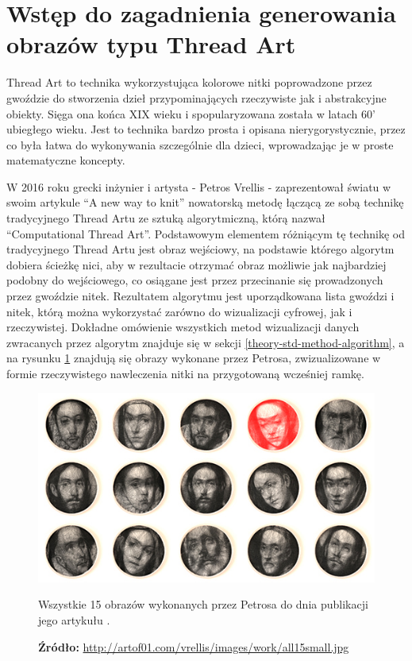     \section{Wstęp do zagadnienia generowania obrazów typu Thread Art} \label{theory-intro}
    Thread Art to technika wykorzystująca kolorowe nitki poprowadzone przez gwoździe do stworzenia dzieł przypominających rzeczywiste jak i abstrakcyjne obiekty. Sięga ona końca XIX wieku i spopularyzowana została w latach 60' ubiegłego wieku. Jest to technika bardzo prosta i opisana nierygorystycznie, przez co była łatwa do wykonywania szczególnie dla dzieci, wprowadzając je w proste matematyczne koncepty. 
    
    W 2016 roku grecki inżynier i artysta - Petros Vrellis - zaprezentował światu w swoim artykule ``A new way to knit'' \cite{new-way-to-knit} nowatorską metodę łączącą ze sobą technikę tradycyjnego Thread Artu ze sztuką algorytmiczną, którą nazwał ``Computational Thread Art''. Podstawowym elementem różniącym tę technikę od tradycyjnego Thread Artu jest obraz wejściowy, na podstawie którego algorytm dobiera ścieżkę nici, aby w rezultacie otrzymać obraz możliwie jak najbardziej podobny do wejściowego, co osiągane jest przez przecinanie się prowadzonych przez gwoździe nitek. Rezultatem algorytmu jest uporządkowana lista gwoździ i nitek, którą można wykorzystać zarówno do wizualizacji cyfrowej, jak i rzeczywistej. Dokładne omówienie wszystkich metod wizualizacji danych zwracanych przez algorytm znajduje się w sekcji \ref{theory-std-method-algorithm}, a na rysunku \ref{theory-all-petros-art} znajdują się obrazy wykonane przez Petrosa, zwizualizowane w formie rzeczywistego nawleczenia nitki na przygotowaną wcześniej ramkę.
    
    \begin{figure}[H]
        \centering
        \includegraphics[width=\textwidth,keepaspectratio]{img/2-theory/petros-art.jpg}
        \caption[Obrazy Petrosa]{Wszystkie 15 obrazów wykonanych przez Petrosa do dnia publikacji jego artykułu \cite{new-way-to-knit}.}
        \caption*{\footnotesize{\textbf{Źródło:} {\url{http://artof01.com/vrellis/images/work/all15small.jpg}}}}
        \label{theory-all-petros-art}
    \end{figure}
    
